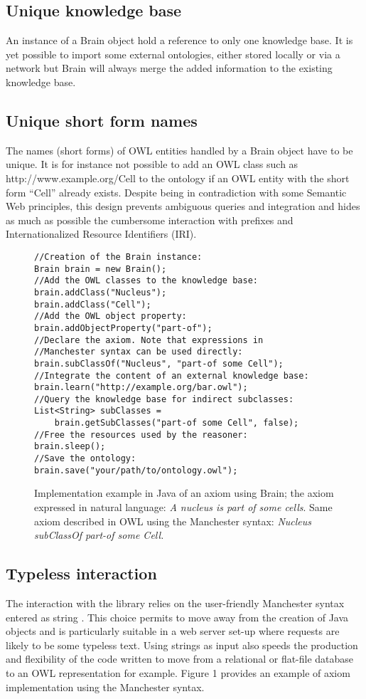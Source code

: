 \documentclass{bioinfo}
\begin{document}
\subsection{Unique knowledge base}
An instance of a Brain object hold a reference to only one knowledge base. It is yet possible to import some external ontologies, either
stored locally or via a network but Brain will always merge the added information to the existing knowledge base.
\subsection{Unique short form names}
The names (short forms) of OWL entities handled by a Brain object have to be unique. It is for instance not possible to add
an OWL class such as http://www.example.org/Cell to the ontology if an OWL entity with the short form ``Cell'' already exists.
Despite being in contradiction with some Semantic Web principles, this design prevents ambiguous queries and integration
and hides as much as possible the cumbersome interaction with prefixes and Internationalized Resource Identifiers (IRI).

\begin{figure}[h]
\begingroup
\fontsize{7pt}{8pt}\selectfont
\begin{Verbatim}[frame=single]
//Creation of the Brain instance:
Brain brain = new Brain();
//Add the OWL classes to the knowledge base:
brain.addClass("Nucleus");
brain.addClass("Cell");
//Add the OWL object property:
brain.addObjectProperty("part-of");
//Declare the axiom. Note that expressions in 
//Manchester syntax can be used directly:
brain.subClassOf("Nucleus", "part-of some Cell");
//Integrate the content of an external knowledge base:
brain.learn("http://example.org/bar.owl");
//Query the knowledge base for indirect subclasses:
List<String> subClasses = 
    brain.getSubClasses("part-of some Cell", false);
//Free the resources used by the reasoner:
brain.sleep();
//Save the ontology:
brain.save("your/path/to/ontology.owl");
\end{Verbatim}
\endgroup
\caption{Implementation example in Java of an axiom using Brain; the axiom expressed in natural language:
 \textit{A nucleus is part of some cells}. Same axiom described in OWL using the Manchester syntax: 
 \textit{Nucleus subClassOf part-of some Cell.}}
\end{figure}
\subsection{Typeless interaction}
The interaction with the library relies on the user-friendly Manchester syntax entered as string \citep{Horridge2006}. 
This choice permits to move away from the creation of Java objects and is particularly suitable in a web server set-up where
requests are likely to be some typeless text. Using strings as input also speeds the production
and flexibility of the code written to move from a relational or flat-file database to an OWL representation for example. Figure 1 provides
an example of axiom implementation using the Manchester syntax.
\end{document}

